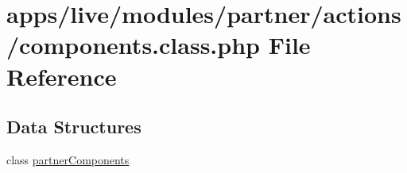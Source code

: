 \hypertarget{live_2modules_2partner_2actions_2components_8class_8php}{\section{apps/live/modules/partner/actions/components.class.\-php File Reference}
\label{live_2modules_2partner_2actions_2components_8class_8php}
}
\subsection*{Data Structures}
\begin{DoxyCompactItemize}
\item 
class \hyperlink{classpartner_components}{partner\-Components}
\end{DoxyCompactItemize}
